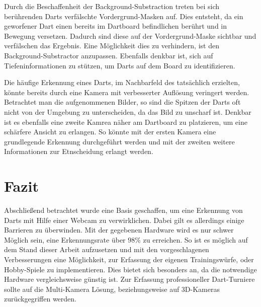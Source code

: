 Durch die Beschaffenheit der Background-Substraction treten bei sich berührenden Darts verfälschte Vordergrund-Masken auf. Dies entsteht, da ein geworfener Dart einen bereits im Dartboard befindlichen berührt und in Bewegung versetzen. Dadurch sind diese auf der Vordergrund-Maske sichtbar und verfälschen das Ergebnis.
Eine Möglichkeit dies zu verhindern, ist den Background-Substractor anzupassen. Ebenfalls denkbar ist, sich auf Tiefeninformationen zu stützen, um Darts auf dem Board zu identifizieren. 


Die häufige Erkennung eines Darts, im Nachbarfeld des tatsächlich erzielten, könnte bereits durch eine Kamera mit verbesserter Auflösung veringert werden. Betrachtet man die aufgenommenen Bilder, so sind die Spitzen der Darts oft nicht von der Umgebung zu unterscheiden, da das Bild zu unscharf ist. Denkbar ist es ebenfalls eine zweite Kamrea näher am Dartboard zu platzieren, um eine schärfere Ansicht zu erlangen. So könnte mit der ersten Kamera eine grundlegende Erkennung durchgeführt werden und mit der zweiten weitere Informationen zur Etnscheidung erlangt werden. 

\section*{Fazit}
Abschließend betrachtet wurde eine Basis geschaffen, um eine Erkennung von Darts mit Hilfe einer Webcam zu verwirklichen. Dabei gilt es allerdings einige Barrieren zu überwinden. Mit der gegebenen Hardware wird es nur schwer Möglich sein, eine Erkennungsrate über $98\%$ zu erreichen. So ist es möglich auf dem Stand dieser Arbeit aufzusetzen und mit den vorgeschlagenen Verbesserungen eine Möglichkeit, zur Erfassung der eigenen Trainingswürfe, oder Hobby-Spiele zu implementieren. Dies bietet sich besonders an, da die notwendige Hardware vergleichsweise günstig ist. Zur Erfassung professioneller Dart-Turniere sollte auf die Multi-Kamera Lösung, beziehungsweise auf 3D-Kameras zurückgegriffen werden.





